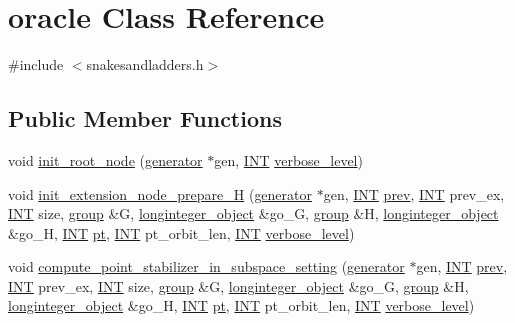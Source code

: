 \hypertarget{classoracle}{}\section{oracle Class Reference}
\label{classoracle}


{\ttfamily \#include $<$snakesandladders.\+h$>$}

\subsection*{Public Member Functions}
\begin{DoxyCompactItemize}
\item 
void \mbox{\hyperlink{classoracle_a39267b7776b0cc2d93cda40fce9813a2}{init\+\_\+root\+\_\+node}} (\mbox{\hyperlink{classgenerator}{generator}} $\ast$gen, \mbox{\hyperlink{galois_8h_a09fddde158a3a20bd2dcadb609de11dc}{I\+NT}} \mbox{\hyperlink{simeon_8_c_a818073fbcc2f439e7c56952f67386122}{verbose\+\_\+level}})
\item 
void \mbox{\hyperlink{classoracle_a6a121e9674bbd011685430a95dbc1b77}{init\+\_\+extension\+\_\+node\+\_\+prepare\+\_\+H}} (\mbox{\hyperlink{classgenerator}{generator}} $\ast$gen, \mbox{\hyperlink{galois_8h_a09fddde158a3a20bd2dcadb609de11dc}{I\+NT}} \mbox{\hyperlink{classoracle_ad17b620d60e6cec94e9d22a9bc984177}{prev}}, \mbox{\hyperlink{galois_8h_a09fddde158a3a20bd2dcadb609de11dc}{I\+NT}} prev\+\_\+ex, \mbox{\hyperlink{galois_8h_a09fddde158a3a20bd2dcadb609de11dc}{I\+NT}} size, \mbox{\hyperlink{classgroup}{group}} \&G, \mbox{\hyperlink{classlonginteger__object}{longinteger\+\_\+object}} \&go\+\_\+G, \mbox{\hyperlink{classgroup}{group}} \&H, \mbox{\hyperlink{classlonginteger__object}{longinteger\+\_\+object}} \&go\+\_\+H, \mbox{\hyperlink{galois_8h_a09fddde158a3a20bd2dcadb609de11dc}{I\+NT}} \mbox{\hyperlink{classoracle_aa8c6db158546ea7a7e59bac20e981313}{pt}}, \mbox{\hyperlink{galois_8h_a09fddde158a3a20bd2dcadb609de11dc}{I\+NT}} pt\+\_\+orbit\+\_\+len, \mbox{\hyperlink{galois_8h_a09fddde158a3a20bd2dcadb609de11dc}{I\+NT}} \mbox{\hyperlink{simeon_8_c_a818073fbcc2f439e7c56952f67386122}{verbose\+\_\+level}})
\item 
void \mbox{\hyperlink{classoracle_ac88b56b30c84a4b5cd9b75869d468025}{compute\+\_\+point\+\_\+stabilizer\+\_\+in\+\_\+subspace\+\_\+setting}} (\mbox{\hyperlink{classgenerator}{generator}} $\ast$gen, \mbox{\hyperlink{galois_8h_a09fddde158a3a20bd2dcadb609de11dc}{I\+NT}} \mbox{\hyperlink{classoracle_ad17b620d60e6cec94e9d22a9bc984177}{prev}}, \mbox{\hyperlink{galois_8h_a09fddde158a3a20bd2dcadb609de11dc}{I\+NT}} prev\+\_\+ex, \mbox{\hyperlink{galois_8h_a09fddde158a3a20bd2dcadb609de11dc}{I\+NT}} size, \mbox{\hyperlink{classgroup}{group}} \&G, \mbox{\hyperlink{classlonginteger__object}{longinteger\+\_\+object}} \&go\+\_\+G, \mbox{\hyperlink{classgroup}{group}} \&H, \mbox{\hyperlink{classlonginteger__object}{longinteger\+\_\+object}} \&go\+\_\+H, \mbox{\hyperlink{galois_8h_a09fddde158a3a20bd2dcadb609de11dc}{I\+NT}} \mbox{\hyperlink{classoracle_aa8c6db158546ea7a7e59bac20e981313}{pt}}, \mbox{\hyperlink{galois_8h_a09fddde158a3a20bd2dcadb609de11dc}{I\+NT}} pt\+\_\+orbit\+\_\+len, \mbox{\hyperlink{galois_8h_a09fddde158a3a20bd2dcadb609de11dc}{I\+NT}} \mbox{\hyperlink{simeon_8_c_a818073fbcc2f439e7c56952f67386122}{verbose\+\_\+level}})

\end{DoxyCompactItemize}
